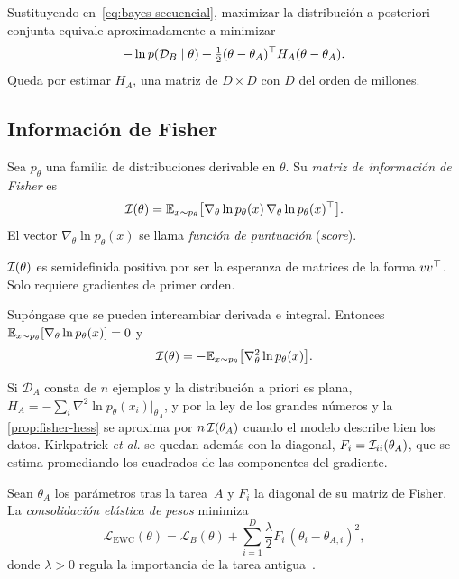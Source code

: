 Sustituyendo en~\eqref{eq:bayes-secuencial}, maximizar la distribución a posteriori conjunta equivale aproximadamente a minimizar
\[
-\ln p(\mathcal{D}_B\mid\theta)+\tfrac12(\theta-\theta_A)^{\top} H_A(\theta-\theta_A).
\]
Queda por estimar $H_A$, una matriz de $D\times D$ con $D$ del orden de millones.

\subsection{Información de Fisher}

\begin{definicion}\label{def:fisher}
Sea $p_\theta$ una familia de distribuciones derivable en $\theta$. Su \emph{matriz de información de Fisher} es
\[
\mathcal{I}(\theta)=\mathbb{E}_{x\sim p_\theta}\bigl[\nabla_\theta\ln p_\theta(x)\,\nabla_\theta\ln p_\theta(x)^{\top}\bigr].
\]
El vector $\nabla_\theta\ln p_\theta(x)$ se llama \emph{función de puntuación} (\emph{score}).
\end{definicion}

$\mathcal{I}(\theta)$ es semidefinida positiva por ser la esperanza de matrices de la forma $vv^{\top}$. Solo requiere gradientes de primer orden.

\begin{proposicion}\label{prop:fisher-hess}
Supóngase que se pueden intercambiar derivada e integral. Entonces $\mathbb{E}_{x\sim p_\theta}[\nabla_\theta\ln p_\theta(x)]=0$ y
\[
\mathcal{I}(\theta)=-\mathbb{E}_{x\sim p_\theta}\bigl[\nabla^{2}_\theta\ln p_\theta(x)\bigr].
\]
\end{proposicion}

Si $\mathcal{D}_A$ consta de $n$ ejemplos y la distribución a priori es plana, $H_A=-\sum_{i}\nabla^{2}\ln p_\theta(x_i)\big|_{\theta_A}$, y por la ley de los grandes números y la \cref{prop:fisher-hess} se aproxima por $n\,\mathcal{I}(\theta_A)$ cuando el modelo describe bien los datos. Kirkpatrick \emph{et al.} se quedan además con la diagonal, $F_i=\mathcal{I}_{ii}(\theta_A)$, que se estima promediando los cuadrados de las componentes del gradiente.

\begin{definicion}[EWC]\label{def:ewc}
Sean $\theta_A$ los parámetros tras la tarea~$A$ y $F_i$ la diagonal de su matriz de Fisher. La \emph{consolidación elástica de pesos} minimiza
\[
\mathcal{L}_{\mathrm{EWC}}(\theta)=\mathcal{L}_B(\theta)+\sum_{i=1}^{D}\frac{\lambda}{2}F_i\,(\theta_i-\theta_{A,i})^{2},
\]
donde $\lambda>0$ regula la importancia de la tarea antigua~\cite{kirkpatrick}.
\end{definicion}

